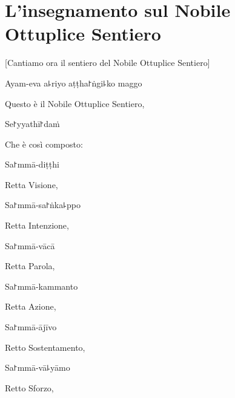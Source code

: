 \chapter[Il Nobile Ottuplice Sentiero]{L'insegnamento sul Nobile Ottuplice Sentiero}


\begin{leader}
\end{leader}

\begin{english}
  [Cantiamo ora il sentiero del Nobile Ottuplice Sentiero]
\end{english}

Ayam-eva a꜕riyo aṭṭha꜓ṅgi꜕ko maggo

\begin{english}
  Questo è il Nobile Ottuplice Sentiero,
\end{english}

Se꜓yyathī꜓daṁ

\begin{english}
  Che è così composto:
\end{english}

Sa꜓mmā-diṭṭhi

\begin{english}
  Retta Visione,
\end{english}

Sa꜓mmā-sa꜓ṅka꜕ppo

\begin{english}
  Retta Intenzione,
\end{english}

Sa꜓mmā-vācā

\begin{english}
  Retta Parola,
\end{english}

Sa꜓mmā-kammanto

\begin{english}
  Retta Azione,
\end{english}

Sa꜓mmā-ājīvo

\begin{english}
  Retto Sostentamento,
\end{english}

Sa꜓mmā-vā꜕yāmo

\begin{english}
  Retto Sforzo,
\end{english}

